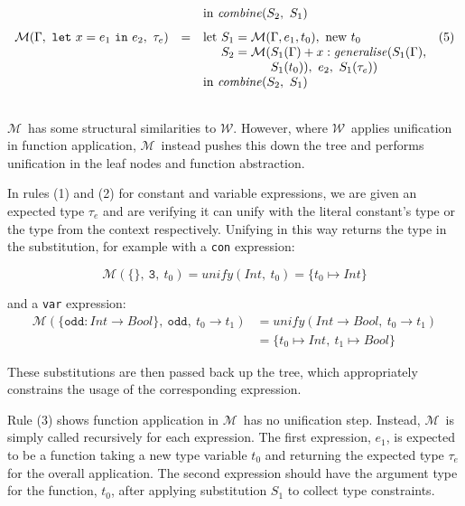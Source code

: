 \documentclass[a4paper,fleqn,oneside,12pt]{report}
\newcommand{\W}{$\mathcal{W}$}
\newcommand{\M}{$\mathcal{M}$}
\begin{document}
$$\begin{array}{lclc}
                                                                           &   & \textrm{in}\ \mathit{combine}(S_2,\ S_1) &\vspace{0.25cm}\\
    \mathcal{M}(\Gamma,\ \mathtt{let}\ x = e_1\ \mathtt{in}\ e_2,\ \tau_e) & = & \textrm{let}\ S_1 = \mathcal{M}(\Gamma, e_1, t_0),\ \textrm{new}\ t_0 & (5)\\
                                                                           &   & \phantom{\textrm{let}}\ S_2 = \mathcal{M}(S_1(\Gamma) + x : \mathit{generalise}(S_1(\Gamma),&\\
                                                                           &   & \phantom{\textrm{let}\ S_2 = \mathcal{M}(} S_1(t_0)),\ e_2,\ S_1(\tau_e)) &\\
                                                                           &   & \textrm{in}\ \mathit{combine}(S_2,\ S_1) &\\
  \\
\end{array}
$$

\M\ has some structural similarities to \W. However, where \W\ applies unification in function application, \M\ instead pushes this down the tree and performs unification in the leaf nodes and function abstraction.

In rules (1) and (2) for constant and variable expressions, we are given an expected type $\tau_e$ and are verifying it can unify with the literal constant’s type or the type from the context respectively. Unifying in this way returns the type in the substitution, for example with a \texttt{con} expression:

$$\mathcal{M}(\{\},\ \mathtt{3},\ t_0) = \mathit{unify}(Int,\ t_0) = \{ t_0 \mapsto Int \}$$

and a \texttt{var} expression:
\begin{align*}
\mathcal{M}(\{ \mathtt{odd} : Int \rightarrow Bool \},\ \mathtt{odd},\ t_0 \rightarrow t_1)
& = \mathit{unify}(Int \rightarrow Bool,\ t_0 \rightarrow t_1)\\
& = \{ t_0 \mapsto Int,\ t_1 \mapsto Bool \}
\end{align*}

These substitutions are then passed back up the tree, which appropriately constrains the usage of the corresponding expression.

Rule (3) shows function application in \M\ has no unification step. Instead, \M\ is simply called recursively for each expression. The first expression, $e_1$, is expected to be a function taking a new type variable $t_0$ and returning the expected type $\tau_e$ for the overall application. The second expression should have the argument type for the function, $t_0$, after applying substitution $S_1$ to collect type constraints.
\end{document}
